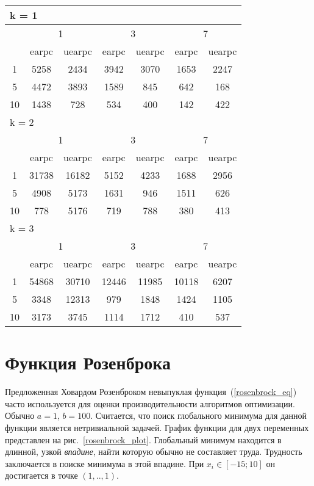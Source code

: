 \begin{table}
 \begin{tabular}{|*7{c|}}
\hline
\multicolumn{7}{|l|}{k = 1} \\
\hline
\multirow{2}{*}{\diagbox{$\mu$}{$\lambda$}} & \multicolumn{2}{c|}{1} & \multicolumn{2}{c|}{3} & \multicolumn{2}{c|}{7} \\
\cline{2-7}
 & earpc & uearpc & earpc & uearpc & earpc & uearpc \\
\hline
1 & 5258 & 2434 & 3942 & 3070 & 1653 & 2247 \\
\hline
5 & 4472 & 3893 & 1589 & 845 & 642 & 168 \\
\hline
10 & 1438 & 728 & 534 & 400 & 142 & 422 \\
\hline
\multicolumn{7}{|l|}{k = 2} \\
\hline
\multirow{2}{*}{\diagbox{$\mu$}{$\lambda$}} & \multicolumn{2}{c|}{1} & \multicolumn{2}{c|}{3} & \multicolumn{2}{c|}{7} \\
\cline{2-7}
 & earpc & uearpc & earpc & uearpc & earpc & uearpc \\
\hline
1 & 31738 & 16182 & 5152 & 4233 & 1688 & 2956 \\
\hline
5 & 4908 & 5173 & 1631 & 946 & 1511 & 626 \\
\hline
10 & 778 & 5176 & 719 & 788 & 380 & 413 \\
\hline
\multicolumn{7}{|l|}{k = 3} \\
\hline
\multirow{2}{*}{\diagbox{$\mu$}{$\lambda$}} & \multicolumn{2}{c|}{1} & \multicolumn{2}{c|}{3} & \multicolumn{2}{c|}{7} \\
\cline{2-7}
 & earpc & uearpc & earpc & uearpc & earpc & uearpc \\
\hline
1 & 54868 & 30710 & 12446 & 11985 & 10118 & 6207 \\
\hline
5 & 3348 & 12313 & 979 & 1848 & 1424 & 1105 \\
\hline
10 & 3173 & 3745 & 1114 & 1712 & 410 & 537 \\
\hline
\end{tabular}
\end{table}


\section{Функция Розенброка}


Предложенная Ховардом Розенброком невыпуклая функция~(\ref{rosenbrock_eq}) часто используется для оценки производительности алгоритмов оптимизации. Обычно $a = 1$, $b = 100$. Считается, что поиск глобального минимума для данной функции является нетривиальной задачей. График функции для двух переменных представлен на рис.~\ref{rosenbrock_plot}. Глобальный минимум находится в длинной, узкой \textit{впадине}, найти которую обычно не составляет труда. Трудность заключается в поиске минимума в этой впадине. При $x_i \in [-15; 10]$ он достигается в точке $(1,..,1)$.

